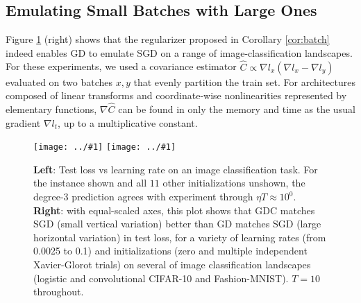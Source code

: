 \documentclass{article}
\theoremstyle{plain}
\theoremstyle{definition}
\newcommand{\plotmoow}[3]{\texttt{[image: ../\#1]}}
\begin{document}
    \subsection{Emulating Small Batches with Large Ones}
        Figure \ref{fig:vanillaandbatch} (right) shows that the regularizer
        proposed in Corollary \ref{cor:batch} indeed enables GD to emulate
        SGD on a range of image-classification landscapes.  For these
        experiments,
        we used a covariance
        estimator $\hat C \propto \nabla l_x (\nabla l_x - \nabla l_y)$ evaluated on
        two batches $x, y$ that evenly partition the train set.
        For architectures composed of linear transforms and coordinate-wise
        nonlinearities represented by elementary functions, $\nabla \hat C$ can be
        found in only the memory and time as the usual gradient
        $\nabla l_t$, up to a multiplicative constant. 
        \begin{figure}[h!] 
            \centering
            \plotmoow{plots/new-test-0}{0.48\columnwidth}{3.0cm} 
            \plotmoow{plots/new-big-bm-new}{0.48\columnwidth}{4.0cm}
            \caption{
                {\bf Left}: Test loss vs learning rate on an image
                classification task.  For the instance shown and all $11$ other
                initializations unshown, the degree-$3$ prediction agrees with
                experiment through $\eta T \approx 10^0$.
                {\bf Right}: with equal-scaled axes, this plot shows that GDC
                matches SGD (small vertical variation) better than GD matches
                SGD (large horizontal variation) in test loss, for a variety of
                learning rates (from 0.0025 to 0.1) and initializations (zero
                and multiple independent Xavier-Glorot trials) on several of
                image classification landscapes (logistic and convolutional
                CIFAR-10 and Fashion-MNIST).  $T=10$ throughout.
            }
            \label{fig:vanillaandbatch}
        \end{figure}
  
\end{document}
